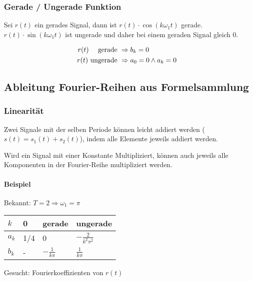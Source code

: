 \subsubsection{Gerade / Ungerade Funktion}

Sei $r(t)$ ein gerades Signal, dann ist $r(t) \cdot \cos(k \omega_1 t)$ gerade. $r(t) \cdot \sin(k \omega_1 t)$ ist ungerade und daher bei einem geraden Signal gleich $0$.

\begin{align*}
r(t) \text{ \space\space\space gerade }   &\Rightarrow b_k = 0 \\
r(t) \text{ ungerade } &\Rightarrow a_0 = 0 \land a_k = 0
\end{align*}



\subsection{Ableitung Fourier-Reihen aus Formelsammlung}

\subsubsection{Linearität}

Zwei Signale mit der selben Periode können leicht addiert werden ($s(t) = s_1(t) + s_2(t)$), indem alle Elemente jeweils addiert werden.

Wird ein Signal mit einer Konstante Multipliziert, können auch jeweils alle Komponenten in der Fourier-Reihe multipliziert werden.


\paragraph{Beispiel}


Bekannt: $T=2 \Rightarrow \omega_1 = \pi$

{\tabulinesep=1.2mm
\begin{tabu}{l | l | l | l}
	$k$ & 0 & gerade & ungerade \\ \hline
	$a_k$ & 1/4 & 0 & $-\frac{2}{k^2\pi^2}$ \\ \hline
	$b_k$ & - & $-\frac{1}{k\pi}$ & $\frac{1}{k\pi}$
\end{tabu}
}




Gesucht: Fourierkoeffizienten von $r(t)$

